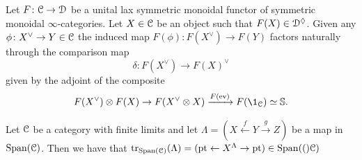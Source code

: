 \begin{lem}
  Let $F\colon \mathcal{C}\to \mathcal{D}$ be a unital lax symmetric monoidal functor of symmetric monoidal $\infty$-categories. Let $X\in \mathcal{C}$ be an object such that $F(X)\in \mathcal{D}^{\lozenge}$.
  Given any $\phi \colon X^{\vee}\to Y \in \mathcal{C}$ the induced map $F(\phi)\colon F(X^{\vee}) \to F(Y)$
  factors naturally through the comparison map
  \[\delta\colon F(X^{\vee})\to F(X)^{\vee}\]
  given by the adjoint of the composite 
  \[ F(X^{\vee})\otimes F(X) \to F(X^{\vee}\otimes X) \xrightarrow{F(\ev)} F(\1_{\cC})\simeq \SS.\]
\end{lem}

\begin{lem}\label{lem: trace in Span}
   Let $\mathcal{C}$ be a category with finite limits and let 
   $\Lambda= (X\xleftarrow{f}Y\xrightarrow{g}Z)$ be a map
   in $\operatorname{\mathrm{Span}}({\mathcal{C}})$. Then we have that 
   $\mathrm{tr}_{\operatorname{\mathrm{Span}}({\mathcal{C}})} (\Lambda) = (\mathrm{pt} \leftarrow X^{\Lambda} \to \mathrm{pt} ) \in \operatorname{\mathrm{Span}}({(})\mathcal{C})$
\end{lem}





